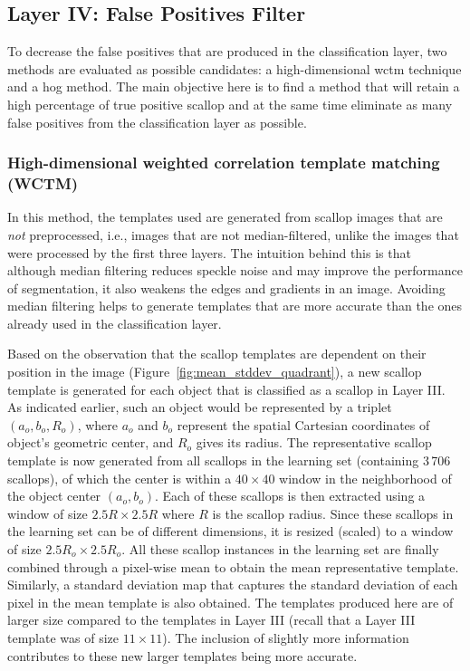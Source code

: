 \documentclass {udthesis}
\begin{document}
\subsection{Layer IV: False Positives Filter}

To decrease the false positives that are produced in the classification layer, two methods are evaluated as possible candidates: a high-dimensional \gls{wctm} technique and a \gls{hog} method. 
The main objective here is to find a method that will retain a high percentage of true positive scallop and at the same time eliminate as many false positives from the classification layer as possible.

\subsubsection{High-dimensional weighted correlation template matching (WCTM)}
In this method, the templates used are generated from scallop images that are \emph{not} preprocessed, i.e., images that are not median-filtered, unlike the images that were processed by the first three layers. 
The intuition behind this is that although median filtering reduces speckle noise and may improve the performance of segmentation, it also weakens the edges and gradients in an image. 
Avoiding median filtering helps to generate templates that are more accurate than the ones already used in the classification layer.

Based on the observation that the scallop templates are dependent on their position in the image (Figure~\ref{fig:mean_stddev_quadrant}), a new scallop template is generated for each object that is classified as a scallop in Layer III. 
As indicated earlier, such an object would be represented by a triplet $(a_o,b_o,R_o)$, where $a_o$ and $b_o$ represent the spatial Cartesian coordinates of object's geometric center, and $R_o$ gives its radius. 
The representative scallop template is now generated from all scallops in the learning set (containing 3\,706 scallops), of which the center is within a $40\times40$ window in the neighborhood of the object center $(a_o,b_o)$. 
Each of these scallops is then extracted using a window of size $2.5R\times2.5R$ where $R$ is the scallop radius. 
Since these scallops in the learning set can be of different dimensions, it is resized (scaled) to a window of size $2.5R_o\times2.5R_o$. 
All these scallop instances in the learning set are finally combined through a pixel-wise mean to obtain the mean representative template. 
Similarly, a standard deviation map that captures the standard deviation of each pixel in the mean template is also obtained.  
The templates produced here are of larger size compared to the templates in Layer III (recall that a Layer III template was of size $11\times11$).
The inclusion of slightly more information contributes to these new larger templates being more accurate.
\end{document}
